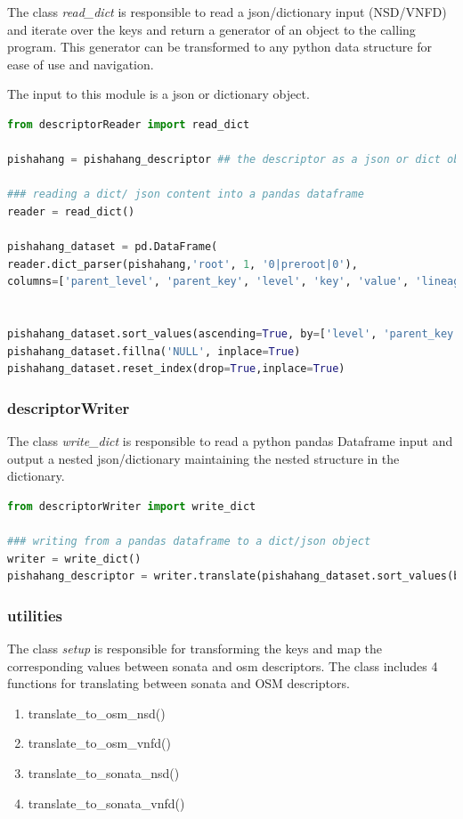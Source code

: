 The class \textit{read\_dict} is responsible to read a json/dictionary input (NSD/VNFD) and iterate over the keys and return a generator of an object to the calling program. This generator can be transformed to any python data structure for ease of use and navigation. 

The input to this module is a json or dictionary object.

\begin{lstlisting}[language=Python,caption=reader to read a json into a DataFrame, label=lis:descriptorReader]
from descriptorReader import read_dict

pishahang = pishahang_descriptor ## the descriptor as a json or dict object

### reading a dict/ json content into a pandas dataframe
reader = read_dict()

pishahang_dataset = pd.DataFrame(
reader.dict_parser(pishahang,'root', 1, '0|preroot|0'), 
columns=['parent_level', 'parent_key', 'level', 'key', 'value', 'lineage'])


pishahang_dataset.sort_values(ascending=True, by=['level', 'parent_key'],inplace=True)
pishahang_dataset.fillna('NULL', inplace=True)
pishahang_dataset.reset_index(drop=True,inplace=True)

\end{lstlisting}
\subsubsection{descriptorWriter}

The class \textit{write\_dict} is responsible to read a python pandas Dataframe input and output a nested json/dictionary maintaining the nested structure in the dictionary.

\begin{lstlisting}[language=Python,caption=writer to write a translated DataFrame into a json, label=lis:descriptorWriter]
from descriptorWriter import write_dict

### writing from a pandas dataframe to a dict/json object
writer = write_dict()
pishahang_descriptor = writer.translate(pishahang_dataset.sort_values(by='lineage'))

\end{lstlisting}

\subsubsection{utilities}

The class \textit{setup} is responsible for transforming the keys and map the corresponding values between sonata and osm descriptors. The class includes 4 functions for translating between sonata and OSM descriptors. 
\begin{enumerate}
	\item translate\_to\_osm\_nsd()
	\item translate\_to\_osm\_vnfd()
	\item translate\_to\_sonata\_nsd()
	\item translate\_to\_sonata\_vnfd()
\end{enumerate}

